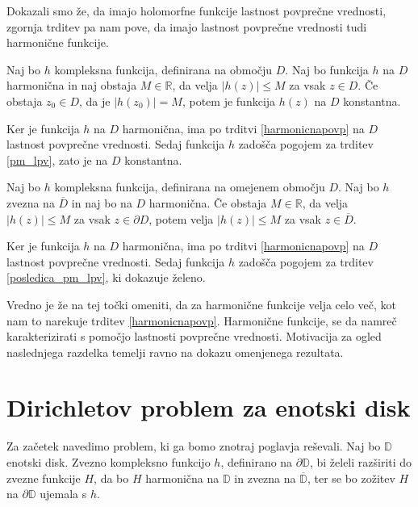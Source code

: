 \documentclass[mat1]{fmfdelo}
\begin{document}
    \begin{opomba}
        Dokazali smo že, da imajo holomorfne funkcije lastnost povprečne vrednosti, zgornja trditev pa nam pove, da imajo lastnost povprečne vrednosti tudi harmonične funkcije. 
    \end{opomba}

    \begin{posledica}
        \label{pm_harm}
        Naj bo $h$ kompleksna funkcija, definirana na območju $D$. Naj bo funkcija $h$ na $D$ harmonična in naj obstaja $M \in \mathbb{R}$, da velja $|h(z)| \leq M$ za vsak $z \in D$. 
        Če obstaja $z_0 \in D$, da je $|h(z_0)| = M$, potem je funkcija $h(z)$ na $D$ konstantna.  
    \end{posledica}
    \begin{dokaz}
        Ker je funkcija $h$ na $D$ harmonična, ima po trditvi \ref{harmonicnapovp} na $D$ lastnost povprečne vrednosti. Sedaj funkcija $h$ zadošča pogojem za trditev \ref{pm_lpv}, zato je na $D$ konstantna.
    \end{dokaz}

    \begin{posledica}
        Naj bo $h$ kompleksna funkcija, definirana na omejenem območju $D$. Naj bo $h$ zvezna na $\overline{D}$ in naj bo na $D$ harmonična. 
        Če obstaja $M \in \mathbb{R}$, da velja $|h(z)| \leq M$ za vsak $z \in \partial D$, potem velja $|h(z)| \leq M$ za vsak $z \in \overline{D}$. 
    \end{posledica}
    \begin{dokaz}
        Ker je funkcija $h$ na $D$ harmonična, ima po trditvi \ref{harmonicnapovp} na $D$ lastnost povprečne vrednosti. Sedaj funkcija $h$ zadošča pogojem za trditev \ref{posledica_pm_lpv}, ki dokazuje želeno.
    \end{dokaz}

    \begin{opomba}
        \label{motivacija}
        Vredno je že na tej točki omeniti, da za harmonične funkcije velja celo več, kot nam to narekuje trditev \ref{harmonicnapovp}. Harmonične funkcije, se da namreč karakterizirati s pomočjo lastnosti povprečne vrednosti. Motivacija za ogled naslednjega razdelka temelji ravno na dokazu omenjenega rezultata.  
    \end{opomba}

\section{Dirichletov problem za enotski disk}
    Za začetek navedimo problem, ki ga bomo znotraj poglavja reševali.
    Naj bo $\mathbb{D}$ enotski disk. Zvezno kompleksno funkcijo $h$, definirano na $\partial \mathbb{D}$, bi želeli razširiti do zvezne funkcije $H$, da bo $H$ harmonična na $\mathbb{D}$ in zvezna na $\overline{\mathbb{D}}$, ter se bo zožitev $H$ na $\partial \mathbb{D}$ ujemala s $h$.
\end{document}

